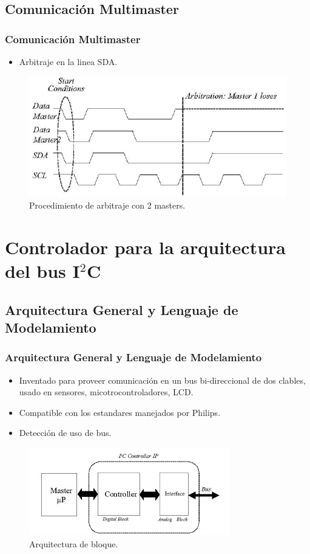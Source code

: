 \documentclass[pstricks,serif, 10pt]{beamer}
\begin{document}
\subsection{Comunicación Multimaster}
\begin{frame}[allowframebreak]
 \frametitle{Comunicación Multimaster}
  \begin{itemize}
   \item Arbitraje en la linea SDA.
  \end{itemize}
  \begin{figure}[H]
  \centering
    \includegraphics[scale=0.35]{com.png}
      \caption{Procedimiento de arbitraje con 2 masters.}
	\label{fig3}
\end{figure}
\end{frame}

\section[Controlador]{Controlador para la arquitectura del bus I$^2$C}
\subsection[Arquitectura y Modelamiento]{Arquitectura General y Lenguaje de Modelamiento}
\begin{frame}
 \frametitle{Arquitectura General y Lenguaje de Modelamiento}
 \begin{itemize}
  \item Inventado para proveer comunicación en un bus bi-direccional de dos clables, usado en sensores, micotrocontroladores, LCD.
  \item Compatible con los estandares manejados por Philips.
  \item Detección de uso de bus.
 \end{itemize}
 \begin{figure}[H]
  \centering
    \includegraphics[scale=0.5]{general.png}
      \caption{Arquitectura de bloque.}
	\label{fig4}
\end{figure}
\end{frame}
\end{document}
